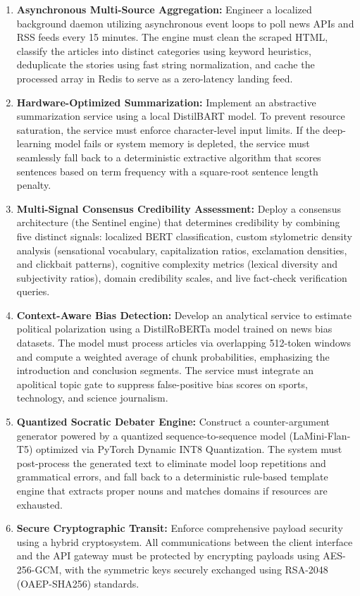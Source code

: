 \begin{enumerate}
    \item \textbf{Asynchronous Multi-Source Aggregation:} Engineer a localized background daemon utilizing asynchronous event loops to poll news APIs and RSS feeds every 15 minutes. The engine must clean the scraped HTML, classify the articles into distinct categories using keyword heuristics, deduplicate the stories using fast string normalization, and cache the processed array in Redis to serve as a zero-latency landing feed.
    \item \textbf{Hardware-Optimized Summarization:} Implement an abstractive summarization service using a local DistilBART model. To prevent resource saturation, the service must enforce character-level input limits. If the deep-learning model fails or system memory is depleted, the service must seamlessly fall back to a deterministic extractive algorithm that scores sentences based on term frequency with a square-root sentence length penalty.
    \item \textbf{Multi-Signal Consensus Credibility Assessment:} Deploy a consensus architecture (the Sentinel engine) that determines credibility by combining five distinct signals: localized BERT classification, custom stylometric density analysis (sensational vocabulary, capitalization ratios, exclamation densities, and clickbait patterns), cognitive complexity metrics (lexical diversity and subjectivity ratios), domain credibility scales, and live fact-check verification queries.
    \item \textbf{Context-Aware Bias Detection:} Develop an analytical service to estimate political polarization using a DistilRoBERTa model trained on news bias datasets. The model must process articles via overlapping 512-token windows and compute a weighted average of chunk probabilities, emphasizing the introduction and conclusion segments. The service must integrate an apolitical topic gate to suppress false-positive bias scores on sports, technology, and science journalism.
    \item \textbf{Quantized Socratic Debater Engine:} Construct a counter-argument generator powered by a quantized sequence-to-sequence model (LaMini-Flan-T5) optimized via PyTorch Dynamic INT8 Quantization. The system must post-process the generated text to eliminate model loop repetitions and grammatical errors, and fall back to a deterministic rule-based template engine that extracts proper nouns and matches domains if resources are exhausted.
    \item \textbf{Secure Cryptographic Transit:} Enforce comprehensive payload security using a hybrid cryptosystem. All communications between the client interface and the API gateway must be protected by encrypting payloads using AES-256-GCM, with the symmetric keys securely exchanged using RSA-2048 (OAEP-SHA256) standards.
\end{enumerate}

